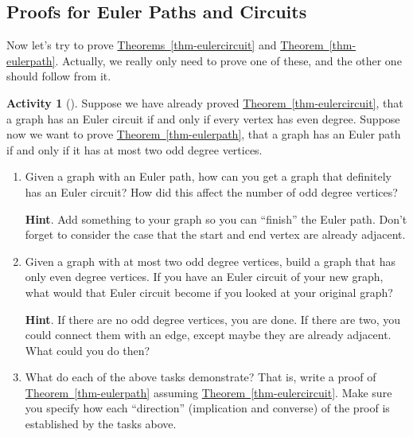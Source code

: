 \documentclass[10pt,]{book}
\theoremstyle{plain}
\theoremstyle{definition}
\theoremstyle{definition}
\theoremstyle{definition}
\newtheorem{activity}[project]{Activity}
\numberwithin{equation}{chapter}
\begin{document}
\subsection[{Proofs for Euler Paths and Circuits}]{Proofs for Euler Paths and Circuits}\label{subsection-3}
\hypertarget{p-179}{}%
Now let's try to prove \hyperref[thm-eulercircuit]{Theorems~\ref{thm-eulercircuit}} and \hyperref[thm-eulerpath]{Theorem~\ref{thm-eulerpath}}.  Actually, we really only need to prove one of these, and the other one should follow from it.%
\begin{activity}[]\label{activity-10}
\hypertarget{p-180}{}%
Suppose we have already proved \hyperref[thm-eulercircuit]{Theorem~\ref{thm-eulercircuit}}, that a graph has an Euler circuit if and only if every vertex has even degree.  Suppose now we want to prove \hyperref[thm-eulerpath]{Theorem~\ref{thm-eulerpath}}, that a graph has an Euler path if and only if it has at most two odd degree vertices.%
\begin{enumerate}[font=\bfseries,label=(\alph*),ref=\alph*]
\item\label{task-13} \hypertarget{p-181}{}%
Given a graph with an Euler path, how can you get a graph that definitely has an Euler circuit?  How did this affect the number of odd degree vertices?%
\par\smallskip%
\noindent\textbf{Hint}.\hypertarget{hint-2}{}\quad%
\hypertarget{p-182}{}%
Add something to your graph so you can ``finish'' the Euler path.  Don't forget to consider the case that the start and end vertex are already adjacent.%
\item\label{task-14} \hypertarget{p-183}{}%
Given a graph with at most two odd degree vertices, build a graph that has only even degree vertices.  If you have an Euler circuit of your new graph, what would that Euler circuit become if you looked at your original graph?%
\par\smallskip%
\noindent\textbf{Hint}.\hypertarget{hint-3}{}\quad%
\hypertarget{p-184}{}%
If there are no odd degree vertices, you are done.  If there are two, you could connect them with an edge, except maybe they are already adjacent.  What could you do then?%
\item\label{task-15} \hypertarget{p-185}{}%
What do each of the above tasks demonstrate?  That is, write a proof of \hyperref[thm-eulerpath]{Theorem~\ref{thm-eulerpath}} assuming \hyperref[thm-eulercircuit]{Theorem~\ref{thm-eulercircuit}}.  Make sure you specify how each ``direction'' (implication and converse) of the proof is established by the tasks above.%
\end{enumerate}
\end{activity}
\end{document}
